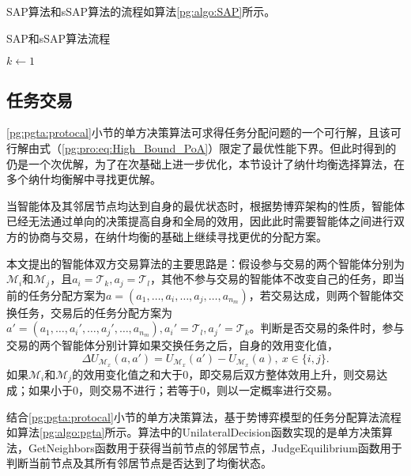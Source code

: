 SAP算法和sSAP算法的流程如算法\ref{pg:algo:SAP}所示。

\begin{algorithm}[htb]
	\caption{SAP和sSAP算法流程}
	\label{pg:algo:SAP}
	\small
	\SetAlgoLined
	$k \gets 1$\;
\end{algorithm}

\subsection{任务交易}
\label{pg:selection}
\ref{pg:pgta:protocal}小节的单方决策算法可求得任务分配问题的一个可行解，且该可行解由式（\ref{pg:pro:eq:High_Bound_PoA}）限定了最优性能下界。但此时得到的仍是一个次优解，为了在次基础上进一步优化，本节设计了纳什均衡选择算法，在多个纳什均衡解中寻找更优解。

当智能体及其邻居节点均达到自身的最优状态时，根据势博弈架构的性质，智能体已经无法通过单向的决策提高自身和全局的效用，因此此时需要智能体之间进行双方的协商与交易，在纳什均衡的基础上继续寻找更优的分配方案。

本文提出的智能体双方交易算法的主要思路是：假设参与交易的两个智能体分别为$\mathcal{M}_i$和$\mathcal{M}_j$，且$a_i=\mathcal{T}_k,a_j=\mathcal{T}_l$，其他不参与交易的智能体不改变自己的任务，即当前的任务分配方案为$a=(a_1,\dots,a_i,\dots,a_j,\dots,a_{n_m})$，若交易达成，则两个智能体交换任务，交易后的任务分配方案为$a'=(a_1,\dots,a_i',\dots,a_j',\dots,a_{n_m}),a_i'=\mathcal{T}_l,a_j'=\mathcal{T}_k$。判断是否交易的条件时，参与交易的两个智能体分别计算如果交换任务之后，自身的效用变化值，
\begin{equation}
\label{pg:eq:deltaU}
	\Delta U_{\mathcal{M}_x}(a,a') = U_{\mathcal{M}_x}(a') - U_{\mathcal{M}_x}(a),\ x \in \{i,j\}.
\end{equation}
如果$\mathcal{M}_i$和$\mathcal{M}_j$的效用变化值之和大于0，即交易后双方整体效用上升，则交易达成；如果小于0，则交易不进行；若等于0，则以一定概率进行交易。

结合\ref{pg:pgta:protocal}小节的单方决策算法，基于势博弈模型的任务分配算法流程如算法\ref{pg:algo:pgta}所示。算法中的UnilateralDecision函数实现的是单方决策算法，GetNeighbors函数用于获得当前节点的邻居节点，JudgeEquilibrium函数用于判断当前节点及其所有邻居节点是否达到了均衡状态。

